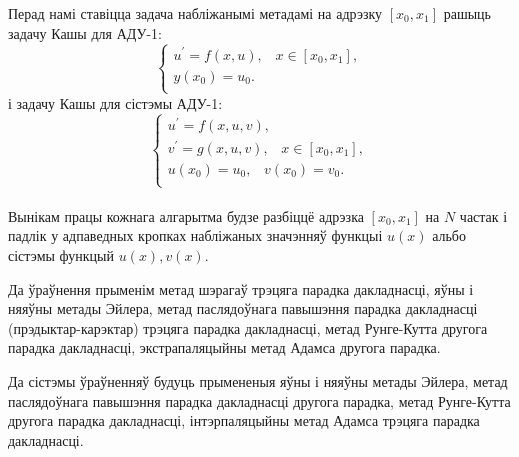 Перад намі ставіцца задача набліжанымі метадамі на адрэзку $[x_0, x_1]$ рашыць задачу Кашы для АДУ-1:
\begin{equation}
    \begin{cases}
        u^{\prime} = f(x,u), \hspace{10pt} x \in [x_0, x_1],\\
        y(x_0) = u_0. \\
    \end{cases}
\end{equation}
і задачу Кашы для сістэмы АДУ-1:
\begin{equation}
    \begin{cases}
        u^{\prime} = f(x, u, v), \\
        v^{\prime} = g(x, u, v), \hspace{10pt} x \in [x_0, x_1],\\
        u(x_0) = u_0, \hspace{10pt} v(x_0) = v_0. \\
    \end{cases}
\end{equation} \\
Вынікам працы кожнага алгарытма будзе разбіццё адрэзка $[x_0, x_1]$ на $N$ частак і падлік у адпаведных кропках набліжаных значэнняў функцыі $u(x)$ альбо сістэмы функцый $u(x), v(x)$.\par
\vspace{5mm}
Да ўраўнення прыменім метад шэрагаў трэцяга парадка дакладнасці, яўны і няяўны метады Эйлера, метад паслядоўнага павышэння парадка дакладнасці (прэдыктар-карэктар) трэцяга парадка дакладнасці, метад Рунге-Кутта другога парадка дакладнасці, экстрапаляцыйны метад Адамса другога парадка.\par
\vspace{5mm}
Да сістэмы ўраўненняў будуць прымененыя яўны і няяўны метады Эйлера, метад паслядоўнага павышэння парадка дакладнасці другога парадка, метад Рунге-Кутта другога парадка дакладнасці, інтэрпаляцыйны метад Адамса трэцяга парадка дакладнасці.\par

